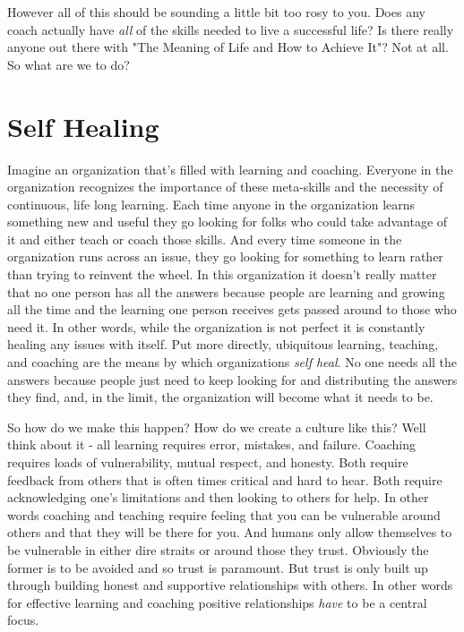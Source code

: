 \documentclass[11pt,a5paper]{book}
\begin{document}
However all of this should be sounding a little bit too rosy to you. Does any coach actually have \textit{all} of the skills needed to live a successful life? Is there really anyone out there with "The Meaning of Life and How to Achieve It"? Not at all. So what are we to do? 

\section{Self Healing}
Imagine an organization that's filled with learning and coaching. Everyone in the organization recognizes the importance of these meta-skills and the necessity of continuous, life long learning. Each time anyone in the organization learns something new and useful they go looking for folks who could take advantage of it and either teach or coach those skills. And every time someone in the organization runs across an issue, they go looking for something to learn rather than trying to reinvent the wheel. In this organization it doesn't really matter that no one person has all the answers because people are learning and growing all the time and the learning one person receives gets passed around to those who need it. In other words, while the organization is not perfect it is constantly healing any issues with itself. Put more directly, ubiquitous learning, teaching, and coaching are the means by which organizations \textit{self heal}. No one needs all the answers because people just need to keep looking for and distributing the answers they find, and, in the limit, the organization will become what it needs to be.
\newline

So how do we make this happen? How do we create a culture like this? Well think about it - all learning requires error, mistakes, and failure. Coaching requires loads of vulnerability, mutual respect, and honesty. Both require feedback from others that is often times critical and hard to hear. Both require acknowledging one's limitations and then looking to others for help. In other words coaching and teaching require feeling that you can be vulnerable around others and that they will be there for you. And humans only allow themselves to be vulnerable in either dire straits or around those they trust. Obviously the former is to be avoided and so trust is paramount. But trust is only built up through building honest and supportive relationships with others. In other words for effective learning and coaching positive relationships \textit{have} to be a central focus.
\newline
\end{document}
